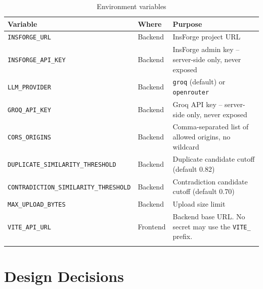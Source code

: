 \documentclass[11pt,a4paper]{article}
\begin{document}
\begin{longtable}{p{4.2cm} p{1.6cm} p{7cm}}
\toprule
\textbf{Variable} & \textbf{Where} & \textbf{Purpose} \\
\midrule
\endhead
\texttt{INSFORGE\_URL} & Backend & InsForge project URL \\
\texttt{INSFORGE\_API\_KEY} & Backend & InsForge admin key -- server-side only, never exposed \\
\texttt{LLM\_PROVIDER} & Backend & \texttt{groq} (default) or \texttt{openrouter} \\
\texttt{GROQ\_API\_KEY} & Backend & Groq API key -- server-side only, never exposed \\
\texttt{CORS\_ORIGINS} & Backend & Comma-separated list of allowed origins, no wildcard \\
\texttt{DUPLICATE\_SIMILARITY\_THRESHOLD} & Backend & Duplicate candidate cutoff (default 0.82) \\
\texttt{CONTRADICTION\_SIMILARITY\_THRESHOLD} & Backend & Contradiction candidate cutoff (default 0.70) \\
\texttt{MAX\_UPLOAD\_BYTES} & Backend & Upload size limit \\
\texttt{VITE\_API\_URL} & Frontend & Backend base URL. No secret may use the \texttt{VITE\_} prefix. \\
\bottomrule
\caption{Environment variables}
\end{longtable}

\section{Design Decisions}
\end{document}
